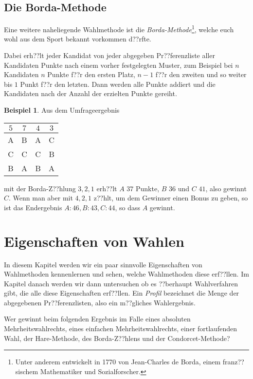 \documentclass{zirkelblatt1415}
\theoremstyle{definition}
\theoremstyle{definition}
\newtheorem*{beispiel}{Beispiel}
\theoremstyle{definition}
\theoremstyle{definition}
\theoremstyle{remark}
\begin{document}
\subsection{Die Borda-Methode}

Eine weitere naheliegende Wahlmethode ist die \emph{Borda-Methode}\footnote{Unter anderem entwickelt in 1770 von Jean-Charles de Borda, einem franz??sischem Mathematiker und Sozialforscher.}, welche euch wohl aus dem Sport bekannt vorkommen d??rfte.

Dabei erh??lt jeder Kandidat von jeder abgegeben Pr??ferenzliste aller Kandidaten Punkte nach einem vorher festgelegten Muster, zum Beispiel bei $n$ Kandidaten $n$ Punkte f??r den ersten Platz, $n-1$ f??r den zweiten und so weiter bis $1$ Punkt f??r den letzten. Dann werden alle Punkte addiert und die Kandidaten nach der Anzahl der erzielten Punkte gereiht.

\begin{beispiel}
Aus dem Umfrageergebnis
\begin{center}
    \begin{tabular}{cccc}
    \toprule 
     $5$ & $7$ & $4$ & $3$ \\ \midrule
    A & B & A & C \\[5pt]
    C & C & C & B \\[5pt]
    B & A & B & A \\
    \bottomrule
    \end{tabular}
\end{center}
mit der Borda-Z??hlung $3,2,1$ erh??lt $A$ $37$ Punkte, $B$ $36$ und $C$ $41$, also gewinnt $C$. Wenn man aber mit $4,2,1$ z??hlt, um dem Gewinner einen Bonus zu geben, so ist das Endergebnis $A:46,B:43,C:44$, so dass $A$ gewinnt.
\end{beispiel}

\section{Eigenschaften von Wahlen}

In diesem Kapitel werden wir ein paar sinnvolle Eigenschaften von Wahlmethoden kennenlernen und sehen, welche Wahlmethoden diese erf??llen. Im Kapitel danach werden wir dann untersuchen ob es ??berhaupt Wahlverfahren gibt, die alle diese Eigenschaften erf??llen. Ein \emph{Profil} bezeichnet die Menge der abgegebenen Pr??ferenzlisten, also ein m??gliches Wahlergebnis.

\begin{aufgabe}{}
Wer gewinnt beim folgenden Ergebnis im Falle eines absoluten Mehrheitswahlrechts, eines einfachen Mehrheitswahlrechts, einer fortlaufenden Wahl, der Hare-Methode, des Borda-Z??hlens und der Condorcet-Methode?
\end{aufgabe}
\end{document}
